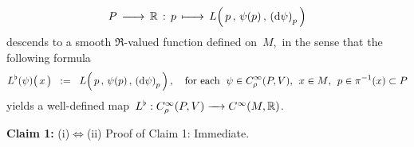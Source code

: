 \begin{theorem}
\begin{enumerate}
    \begin{equation*}
    P \,\xrightarrow{{\color{white}......}}\, \Re \,:\,
    p \,\xmapsto{{\color{white}......}}\,
        L\!\left(\,
            \overset{{\color{white}1}}{p}
            \,,\,
            \psi(p)
            \,,\,
            \left(\d\psi\right)_{p}
            \,\right)
    \end{equation*}
    {\color{red}descends} to a smooth $\Re$-valued function defined on \,$M$,\,
    in the sense that the following formula
    \begin{equation*}
    L^{\flat}(\psi)\!\left(\,\overset{{\color{white}.}}{x}\,\right)
    \;\; := \;\;
        L\!\left(\,
            \overset{{\color{white}1}}{p}
            \,,\,
            \psi(p)
            \,,\,
            \left(\d\psi\right)_{p}
            \,\right),
    \quad
    \textnormal{for each \;$\psi \in C^{\infty}_{\rho}(P,V)$,\; $x \in M$,\; $p \in \pi^{-1}(x) \subset P$}
    \end{equation*}
    yields a well-defined map
    \,$L^{\flat} : C^{\infty}_{\rho}(P,V) \xrightarrow{{\color{white}....}} C^{\infty}(M,\Re)$.\,
\end{enumerate}
\end{theorem}
\proof

\vskip 0.3cm
\noindent
\textbf{Claim 1:}\; (i)\;$\Longleftrightarrow$\;(ii)
\vskip 0.2cm
\noindent
Proof of Claim 1:\; Immediate.

